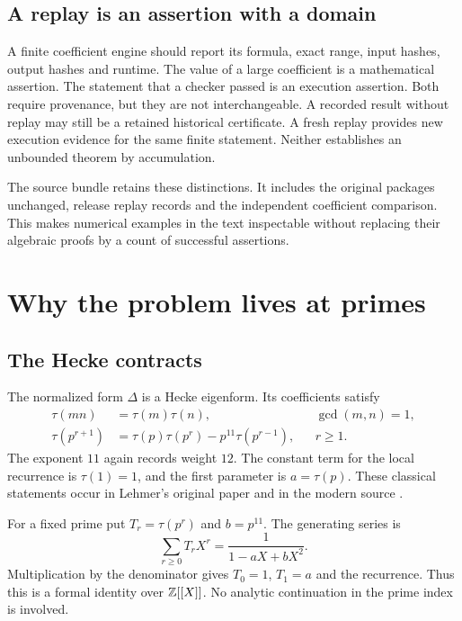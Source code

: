 
\section{A replay is an assertion with a domain}
A finite coefficient engine should report its formula, exact range, input hashes, output hashes and runtime. The value of a large coefficient is a mathematical assertion. The statement that a checker passed is an execution assertion. Both require provenance, but they are not interchangeable. A recorded result without replay may still be a retained historical certificate. A fresh replay provides new execution evidence for the same finite statement. Neither establishes an unbounded theorem by accumulation.

The source bundle retains these distinctions. It includes the original packages unchanged, release replay records and the independent coefficient comparison. This makes numerical examples in the text inspectable without replacing their algebraic proofs by a count of successful assertions.

\chapter{Why the problem lives at primes}\label{ch:prime}
\section{The Hecke contracts}
The normalized form $\Delta$ is a Hecke eigenform. Its coefficients satisfy
\begin{align}
\tau(mn)&=\tau(m)\tau(n),&&\gcd(m,n)=1,\label{eq:mult}\\
\tau(p^{r+1})&=\tau(p)\tau(p^r)-p^{11}\tau(p^{r-1}),&&r\ge1.\label{eq:hecke}
\end{align}
The exponent $11$ again records weight $12$. The constant term for the local recurrence is $\tau(1)=1$, and the first parameter is $a=\tau(p)$. These classical statements occur in Lehmer's original paper and in the modern source \cite{Lehmer,BCO}.

For a fixed prime put $T_r=\tau(p^r)$ and $b=p^{11}$. The generating series is
\begin{equation}\label{eq:heckegen}
\sum_{r\ge0}T_rX^r=\frac1{1-aX+bX^2}.
\end{equation}
Multiplication by the denominator gives $T_0=1$, $T_1=a$ and the recurrence. Thus this is a formal identity over $\mathbb Z[[X]]$. No analytic continuation in the prime index is involved.

